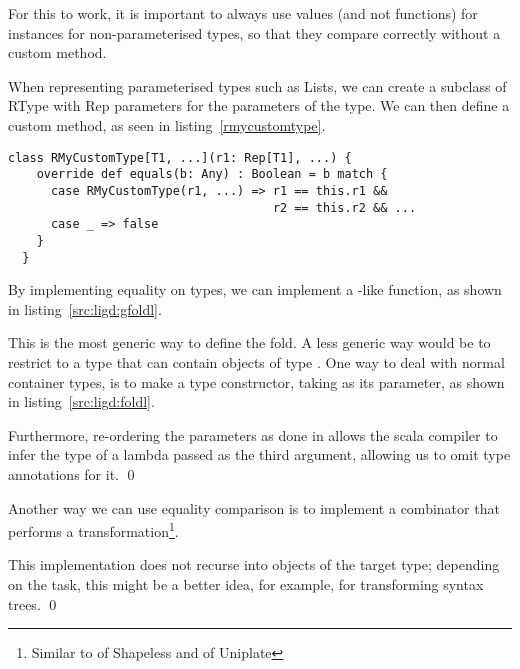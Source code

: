 For this to work, it is important to always use values (and not functions)
for  instances for non-parameterised types, so that they compare
correctly without a custom  method.

When representing parameterised types such as Lists, we can create a subclass
of RType with Rep parameters for the parameters of the type. We can then
define a custom  method, as seen in listing~\ref{rmycustomtype}.

\begin{lstlisting}[float,caption=Pattern for representing parameterised types,label=rmycustomtype]
  class RMyCustomType[T1, ...](r1: Rep[T1], ...) {
    override def equals(b: Any) : Boolean = b match {
      case RMyCustomType(r1, ...) => r1 == this.r1 &&
                                     r2 == this.r2 && ...
      case _ => false
    }
  }
\end{lstlisting}


\begin{example}
  By implementing equality on types, we can implement a -like
  function, as shown in listing~\ref{src:ligd:gfoldl}.

  

  This is the most generic way to define the fold. A less generic way would be
  to restrict  to a type that can contain objects of type . One way
  to deal with normal container types, is to make  a type constructor,
  taking  as its parameter, as shown in listing~\ref{src:ligd:foldl}.

  

  Furthermore, re-ordering the parameters as done in  allows the
  scala compiler to infer the type of a lambda passed as the third argument,
  allowing us to omit type annotations for it. \qed
\end{example}

\begin{example}
  Another way we can use equality comparison is to implement a
  combinator that performs a transformation\footnote{Similar to 
  of Shapeless and  of Uniplate}.

  

  This implementation does not recurse into objects of the target type; depending
  on the task, this might be a better idea, for example, for transforming
  syntax trees. \qed
\end{example}


